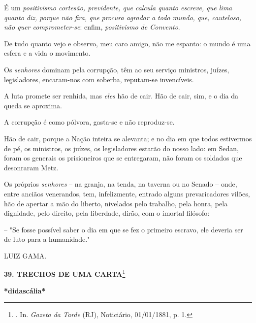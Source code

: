 É um \emph{positivismo cortesão, previdente, que calcula quanto escreve,
que lima quanto diz, porque não fira, que procura agradar a todo mundo,
que, cauteloso, não quer comprometer-se}: enfim, \emph{positivismo de
Convento}.

De tudo quanto vejo e observo, meu caro amigo, não me espanto: o mundo é
uma esfera e a vida o movimento.

Os \emph{senhores} dominam pela corrupção, têm ao seu serviço ministros,
juízes, legisladores, encaram-nos com soberba, reputam-se invencíveis.

A luta promete ser renhida, mas \emph{eles} hão de cair. Hão de cair,
sim, e o dia da queda se aproxima.

A corrupção é como pólvora, gasta-se e não reproduz-se.

Hão de cair, porque a Nação inteira se alevanta; e no dia em que todos
estivermos de pé, os ministros, os juízes, os legisladores estarão do
nosso lado: em Sedan, foram os generais os prisioneiros que se
entregaram, não foram os soldados que desonraram Metz.

Os próprios \emph{senhores} -- na granja, na tenda, na taverna ou no
Senado -- onde, entre anciãos venerandos, tem, infelizmente, entrado
alguns prevaricadores vilões, hão de apertar a mão do liberto, nivelados
pelo trabalho, pela honra, pela dignidade, pelo direito, pela liberdade,
dirão, com o imortal filósofo:

-- "Se fosse possível saber o dia em que se fez o primeiro escravo, ele
deveria ser de luto para a humanidade."

LUIZ GAMA.

\textbf{39. TRECHOS DE UMA CARTA}\footnote{. In. \emph{Gazeta da Tarde}
  (RJ), Noticiário, 01/01/1881, p. 1.}

\textbf{*didascália*}

